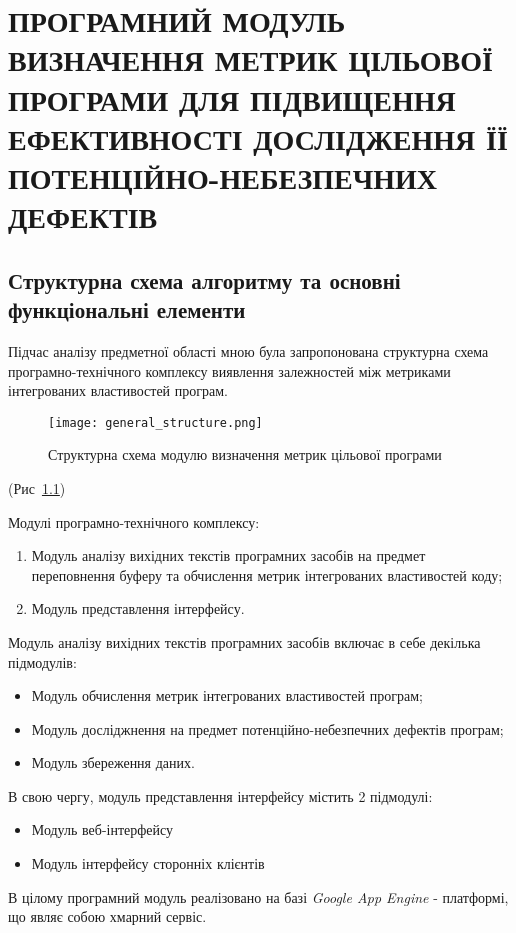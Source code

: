 \chapter{ПРОГРАМНИЙ МОДУЛЬ ВИЗНАЧЕННЯ МЕТРИК ЦІЛЬОВОЇ ПРОГРАМИ ДЛЯ ПІДВИЩЕННЯ ЕФЕКТИВНОСТІ ДОСЛІДЖЕННЯ ЇЇ ПОТЕНЦІЙНО-НЕБЕЗПЕЧНИХ ДЕФЕКТІВ}
\label{3section::doc}\label{3section:id1}

\section{Структурна схема алгоритму та основні функціональні елементи}
\label{3section:id2}
Підчас аналізу предметної області мною була запропонована структурна схема програмно-технічного комплексу виявлення залежностей між метриками інтегрованих властивостей програм.
\begin{figure} [h]
    \centering
    \texttt{[image: general\_structure.png]}
    \caption{Структурна схема модулю визначення метрик цільової програми}
    \label{fig:general_structure}
\end{figure}
(Рис \,\ref{fig:general_structure})

Модулі програмно-технічного комплексу:
\begin{enumerate}
 \item Модуль аналізу вихідних текстів програмних засобів на предмет переповнення буферу та обчислення метрик інтегрованих властивостей коду;
 \item Модуль представлення інтерфейсу.
\end{enumerate}

Модуль аналізу вихідних текстів програмних засобів включає в себе декілька підмодулів:
\begin{itemize}
 \item Модуль обчислення метрик інтегрованих властивостей програм;
 \item Модуль досліджнення на предмет потенційно-небезпечних дефектів програм;
 \item Модуль збереження даних.
\end{itemize}

В свою чергу, модуль представлення інтерфейсу містить 2 підмодулі:
\begin{itemize}
 \item Модуль веб-інтерфейсу
 \item Модуль інтерфейсу сторонніх клієнтів
\end{itemize}

В цілому програмний модуль реалізовано на базі {\itshape Google App Engine}  - платформі, що являє собою хмарний сервіс.

